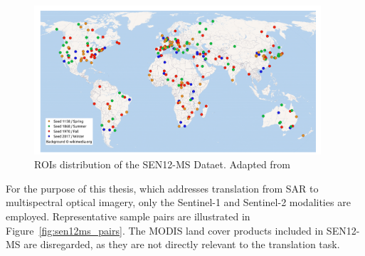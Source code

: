\begin{figure}[!htbp]
  \centering
  \includegraphics[width=0.95\textwidth]{img/sen_12_ms_distribution.png}
  \caption[ROIs distribution of the SEN12-MS Dataet]{ROIs distribution of the SEN12-MS Dataet. Adapted from \cite{sen12ms_2019}}
  \label{fig:sen_12_ms_dist}
\end{figure}

For the purpose of this thesis, which addresses translation from SAR to multispectral optical imagery, only the Sentinel-1 and Sentinel-2 modalities are employed. Representative sample pairs are illustrated in Figure~\ref{fig:sen12ms_pairs}. The MODIS land cover products included in SEN12-MS are disregarded, as they are not directly relevant to the translation task.

